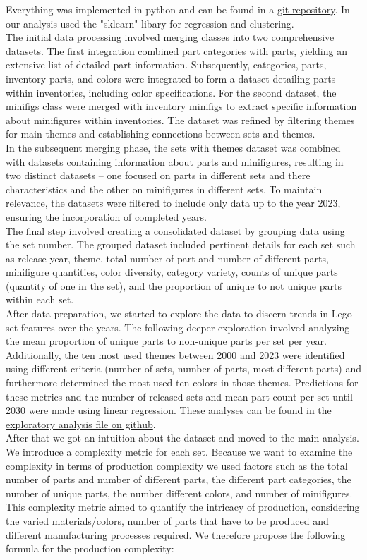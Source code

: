 \documentclass{article}
\theoremstyle{plain}
\theoremstyle{definition}
\theoremstyle{remark}
\begin{document}
Everything was implemented in python and can be found in a \href{https://github.com/eddiebeach99/Data_Literacy/tree/development}{git repository}. In our analysis used the "sklearn" libary for regression and clustering. \\
The initial data processing involved merging classes into two comprehensive datasets. The first integration combined part categories with parts, yielding an extensive list of detailed part information. Subsequently, categories, parts, inventory parts, and colors were integrated to form a dataset detailing parts within inventories, including color specifications. For the second dataset, the minifigs class were merged with inventory minifigs to extract specific information about minifigures within inventories. The dataset was refined by filtering themes for main themes and establishing connections between sets and themes.\\
In the subsequent merging phase, the sets with themes dataset was combined with datasets containing information about parts and minifigures, resulting in two distinct datasets – one focused on parts in different sets and there characteristics and the other on minifigures in different sets. To maintain relevance, the datasets were filtered to include only data up to the year 2023, ensuring the incorporation of completed years.\\
The final step involved creating a consolidated dataset by grouping data using the set number. The grouped dataset included pertinent details for each set such as release year, theme, total number of part and number of different parts, minifigure quantities, color diversity, category variety, counts of unique parts (quantity of one in the set), and the proportion of unique to not unique parts within each set.\\
After data preparation, we started to explore the data to discern trends in Lego set features over the years. The following deeper exploration involved analyzing the mean proportion of unique parts to non-unique parts per set per year. Additionally, the ten most used themes between 2000 and 2023 were identified using different criteria (number of sets, number of parts, most different parts) and furthermore determined the most used ten colors in those themes. Predictions for these metrics and the number of released sets and mean part count per set until 2030 were made using linear regression. These analyses can be found in the \href{https://github.com/eddiebeach99/Data_Literacy/blob/main/Analysis/exploratory_analysis.ipynb}{exploratory analysis file on github}. \\
After that we got an intuition about the dataset and moved to the main analysis. We introduce a complexity metric for each set. Because we want to examine the complexity in terms of production complexity we used factors such as the total number of parts and number of different parts, the different part categories, the number of unique parts, the number different colors, and number of minifigures. This complexity metric aimed to quantify the intricacy of production, considering the varied materials/colors, number of parts that have to be produced and different manufacturing processes required. We therefore propose the following formula for the production complexity:
\end{document}

